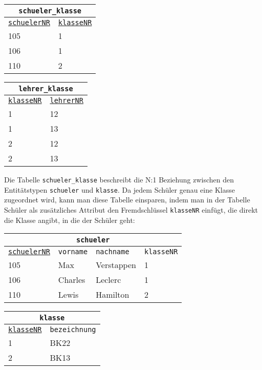 \begin{minipage}{\textwidth}
	\begin{minipage}{0.5\textwidth}
		\begin{tabular}{ll}
			\multicolumn{2}{c}{\lstinline!schueler_klasse!}\\
			\hline
			\underline{\lstinline!schuelerNR!}&\underline{\lstinline!klasseNR!}\\
			\hline
			105&1\\
			106&1\\
			110&2\\
		\end{tabular}
	\end{minipage}
	\begin{minipage}{0.5\textwidth}
		\begin{tabular}{ll}
			\multicolumn{2}{c}{\lstinline!lehrer_klasse!}\\
			\hline
			\underline{\lstinline!klasseNR!}&\underline{\lstinline!lehrerNR!}\\
			\hline
			1&12\\
			1&13\\
			2&12\\
			2&13\\
		\end{tabular}
	\end{minipage}
\end{minipage}
Die Tabelle \lstinline!schueler_klasse! beschreibt die N:1 Beziehung zwischen den Entitätstypen \lstinline!schueler! und \lstinline!klasse!. Da jedem Schüler genau eine Klasse zugeordnet wird, kann man diese Tabelle einsparen, indem man in der Tabelle Schüler als zusätzliches Attribut den Fremdschlüssel \lstinline!klasseNR! einfügt, die direkt die Klasse angibt, in die der Schüler geht:
\begin{minipage}{\textwidth}
	\begin{minipage}{0.6\textwidth}
		\begin{tabular}{llll}
			\multicolumn{4}{c}{\lstinline!schueler!}\\
			\hline
			\underline{\lstinline!schuelerNR!}&\lstinline!vorname!&\lstinline!nachname!&\lstinline!klasseNR!\\
			\hline
			105&Max&Verstappen&1\\
			106&Charles&Leclerc&1\\
			110&Lewis&Hamilton&2\\
		\end{tabular}
	\end{minipage}
	\begin{minipage}{0.4\textwidth}
		\begin{tabular}{ll}
			\multicolumn{2}{c}{\lstinline!klasse!}\\
			\hline
			\underline{\lstinline!klasseNR!}&\lstinline!bezeichnung!\\
			\hline
			1&BK22\\
			2&BK13\\
		\end{tabular}
	\end{minipage}
\end{minipage}
